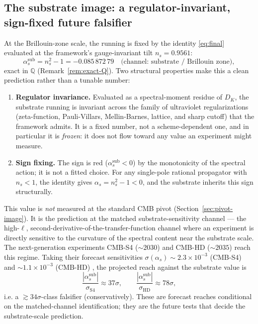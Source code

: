 \documentclass[12pt]{article}
\theoremstyle{definition}
\theoremstyle{remark}
\begin{document}
\subsection{The substrate image: a regulator-invariant, sign-fixed future falsifier}\label{sec:substrate-image}

At the Brillouin-zone scale, the running is fixed by the identity \eqref{eq:final} evaluated at the framework's gauge-invariant tilt $n_s = 0.9561$:
\begin{equation}\label{eq:alpha-sub}
  \alpha_s^{\mathrm{sub}} = n_s^2 - 1 = -0.085\,872\,79\quad\text{(channel: substrate / Brillouin zone)},
\end{equation}
exact in $\mathbb{Q}$ (Remark~\ref{rem:exact-Q}). Two structural properties make this a clean prediction rather than a tunable number:
\begin{enumerate}
  \item \textbf{Regulator invariance.} Evaluated as a spectral-moment residue of $D_K$, the substrate running is invariant across the family of ultraviolet regularizations (zeta-function, Pauli-Villars, Mellin-Barnes, lattice, and sharp cutoff) that the framework admits. It is a fixed number, not a scheme-dependent one, and in particular it is \emph{frozen}: it does not flow toward any value an experiment might measure.
  \item \textbf{Sign fixing.} The sign is red ($\alpha_s^{\mathrm{sub}} < 0$) by the monotonicity of the spectral action; it is not a fitted choice. For any single-pole rational propagator with $n_s < 1$, the identity gives $\alpha_s = n_s^2 - 1 < 0$, and the substrate inherits this sign structurally.
\end{enumerate}

This value is \emph{not} measured at the standard CMB pivot (Section~\ref{sec:pivot-image}). It is the prediction at the matched substrate-sensitivity channel --- the high-$\ell$, second-derivative-of-the-transfer-function channel where an experiment is directly sensitive to the curvature of the spectral content near the substrate scale. The next-generation experiments CMB-S4 ($\sim 2030$) and CMB-HD ($\sim 2035$) reach this regime. Taking their forecast sensitivities $\sigma(\alpha_s) \sim 2.3 \times 10^{-3}$ (CMB-S4) and $\sim 1.1 \times 10^{-3}$ (CMB-HD) \citep{CMBS4ScienceBook2016}, the projected reach against the substrate value is
\begin{equation}\label{eq:reach}
  \frac{|\alpha_s^{\mathrm{sub}}|}{\sigma_{\mathrm{S4}}} \approx 37\sigma, \qquad
  \frac{|\alpha_s^{\mathrm{sub}}|}{\sigma_{\mathrm{HD}}} \approx 78\sigma,
\end{equation}
i.e. a $\gtrsim 34\sigma$-class falsifier (conservatively). These are forecast reaches conditional on the matched-channel identification; they are the future tests that decide the substrate-scale prediction.
\end{document}
